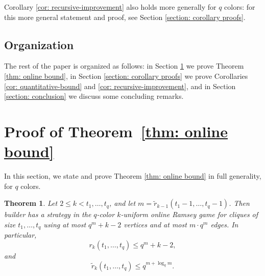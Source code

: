 \documentclass[A4paper,reqno,oneside,12pt]{amsart}
\theoremstyle{plain}
\newtheorem{theorem}{Theorem}
\theoremstyle{definition}
\begin{document}
Corollary \ref{cor: recursive-improvement} also holds more generally for $q$ colors: for this more general statement and proof, see Section \ref{section: corollary proofs}. \\

\noindent
\subsection*{Organization} The rest of the paper is organized as follows:
in Section \ref{section: proof of online bound} we prove Theorem \ref{thm: online bound}, in Section \ref{section: corollary proofs} we prove Corollaries \ref{cor: quantitative-bound} and \ref{cor: recursive-improvement}, and in Section \ref{section: conclusion} we discuss some concluding remarks. 


\section{Proof of Theorem~\ref{thm: online bound}}
\label{section: proof of online bound}

In this section, we state and prove Theorem \ref{thm: online bound} in full generality, for $q$ colors.

\begin{theorem}
    Let $2 \leq k < t_1, \dots, t_q$, and let $m = \tilde{r}_{k-1}(t_1-1, \dots, t_q-1)$.
    Then builder has a strategy in the $q$-color $k$-uniform online Ramsey game for cliques of size $t_1, \dots, t_q$ using at most $q^m+ k - 2$ vertices and at most $m \cdot q^m$ edges.
    In particular,
    \begin{equation} \label{eq: q-color ramsey bound}
        r_k(t_1, \dots, t_q) \leq q^m + k - 2,
    \end{equation}
    and
    \begin{equation} \label{eq: q-color online bound}
        \tilde{r}_k(t_1, \dots, t_q) \leq q^{m + \log_q m}.
    \end{equation}
\end{theorem}
\end{document}
